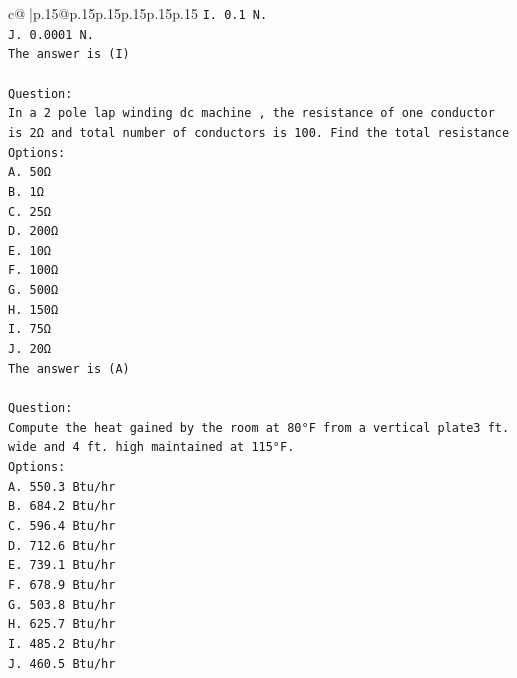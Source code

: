 \documentclass{article}
\begin{document}
{\begin{supertabular}{c@{$\;$}|p{.15\linewidth}@{}p{.15\linewidth}p{.15\linewidth}p{.15\linewidth}p{.15\linewidth}p{.15\linewidth}}
{{{\texttt{I. 0.1 N.} \\
\texttt{J. 0.0001 N.} \\
\texttt{The answer is (I)} \\
\\ 
\texttt{Question:} \\
\texttt{In a 2 pole lap winding dc machine , the resistance of one conductor is 2Ω and total number of conductors is 100. Find the total resistance} \\
\texttt{Options:} \\
\texttt{A. 50Ω} \\
\texttt{B. 1Ω} \\
\texttt{C. 25Ω} \\
\texttt{D. 200Ω} \\
\texttt{E. 10Ω} \\
\texttt{F. 100Ω} \\
\texttt{G. 500Ω} \\
\texttt{H. 150Ω} \\
\texttt{I. 75Ω} \\
\texttt{J. 20Ω} \\
\texttt{The answer is (A)} \\
\\ 
\texttt{Question:} \\
\texttt{Compute the heat gained by the room at 80°F from a vertical plate3 ft. wide and 4 ft. high maintained at 115°F.} \\
\texttt{Options:} \\
\texttt{A. 550.3 Btu/hr} \\
\texttt{B. 684.2 Btu/hr} \\
\texttt{C. 596.4 Btu/hr} \\
\texttt{D. 712.6 Btu/hr} \\
\texttt{E. 739.1 Btu/hr} \\
\texttt{F. 678.9 Btu/hr} \\
\texttt{G. 503.8 Btu/hr} \\
\texttt{H. 625.7 Btu/hr} \\
\texttt{I. 485.2 Btu/hr} \\
\texttt{J. 460.5 Btu/hr} \\
            }
        }
    }
     \\ \\


\end{supertabular}}
\end{document}
